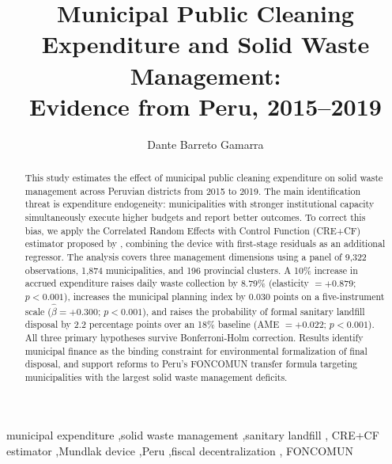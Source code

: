 \documentclass[review,12pt,authoryear,nonatbib]{elsarticle}
\begin{document}
\begin{frontmatter}

\title{Municipal Public Cleaning Expenditure and Solid Waste Management:\\ Evidence from Peru, 2015--2019}


\author[unas]{Dante Barreto Gamarra}

\address[unas]{Faculty of Economics, Universidad Nacional Agraria de la Selva (UNAS),
               Tingo Mar\'ia, Per\'u}

\begin{abstract}
This study estimates the effect of municipal public cleaning expenditure on solid waste management across Peruvian districts from 2015 to 2019. The main identification threat is expenditure endogeneity: municipalities with stronger institutional capacity simultaneously execute higher budgets and report better outcomes. To correct this bias, we apply the Correlated Random Effects with Control Function (CRE+CF) estimator proposed by \citet{Wooldridge2015}, combining the \citet{Mundlak1978} device with first-stage residuals as an additional regressor. The analysis covers three management dimensions using a panel of 9,322 observations, 1,874 municipalities, and 196 provincial clusters. A 10\% increase in accrued expenditure raises daily waste collection by 8.79\% (elasticity $= +0.879$; $p < 0.001$), increases the municipal planning index by 0.030 points on a five-instrument scale ($\hat{\beta} = +0.300$; $p < 0.001$), and raises the probability of formal sanitary landfill disposal by 2.2 percentage points over an 18\% baseline (AME $= +0.022$; $p < 0.001$). All three primary hypotheses survive Bonferroni-Holm correction. Results identify municipal finance as the binding constraint for environmental formalization of final disposal, and support reforms to Peru's FONCOMUN transfer formula targeting municipalities with the largest solid waste management deficits.
\end{abstract}

\begin{keyword}
municipal expenditure \sep solid waste management \sep sanitary landfill \sep
CRE+CF estimator \sep Mundlak device \sep Peru \sep fiscal decentralization \sep
FONCOMUN
%
\end{keyword}

\end{frontmatter}
\end{document}
